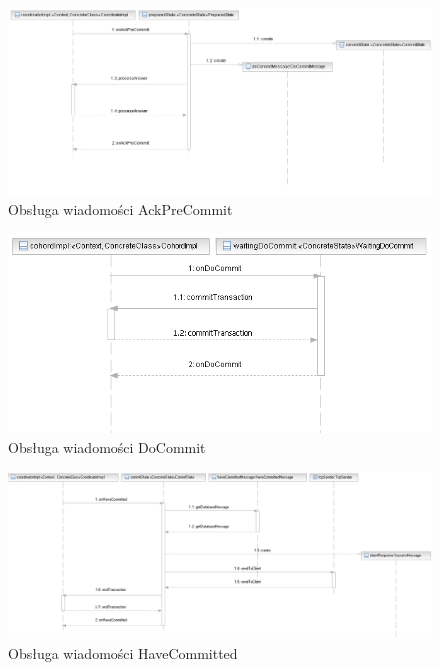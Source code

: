 \documentclass[a4paper, oneside, 11pt]{report}
\begin{document}
\begin{figure}[h]
\centering
\includegraphics[width=22cm,angle=90]{sekwencje/AckDoCommitMessage.png}
\caption{Obsługa wiadomości AckPreCommit}
\end{figure}

\begin{figure}[h]
\centering
\includegraphics[width=22cm,angle=90]{sekwencje/DoCommitMessage.png}
\caption{Obsługa wiadomości DoCommit}
\end{figure}

\begin{figure}[h]
\centering
\includegraphics[width=22cm,angle=90]{sekwencje/HaveCommittedMessage.png}
\caption{Obsługa wiadomości HaveCommitted}
\end{figure}
\end{document}
